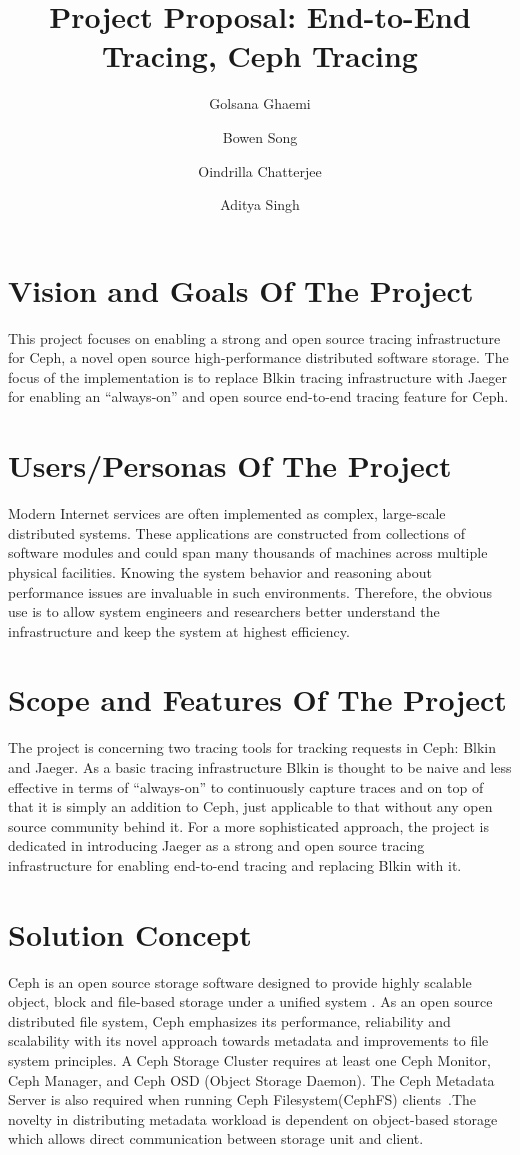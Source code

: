 \documentclass[a4paper, 11pt]{article}
\title{Project Proposal: End-to-End Tracing, Ceph Tracing}
\author[1]{Golsana Ghaemi}
\author[1]{Bowen Song}
\author[1]{Oindrilla Chatterjee}
\author[1]{Aditya Singh}
\affil[1]{Department of Electrical and Computer Engineering}
\affil[1]{Boston University}
\date{}
\begin{document}
\maketitle
\section{Vision and Goals Of The Project}

This project focuses on enabling a strong and open source tracing infrastructure for Ceph, a novel open source high-performance distributed software storage. The focus of the implementation is to replace Blkin tracing infrastructure with Jaeger for enabling an “always-on” and open source end-to-end tracing feature for Ceph.

\section{Users/Personas Of The Project}

Modern Internet services are often implemented as complex, large-scale distributed systems. These applications are constructed from collections of software modules and could span many thousands of machines across multiple physical facilities. Knowing the system behavior and reasoning about performance issues are invaluable in such environments\cite{Dapper}. Therefore, the obvious use is to allow system engineers and researchers better understand the infrastructure and keep the system at highest efficiency.


\section{Scope and Features Of The Project}

The project is concerning two tracing tools for tracking requests in Ceph: Blkin and Jaeger. As a basic tracing infrastructure Blkin is thought to be naive and less effective in terms of “always-on” to continuously capture traces and on top of that it is simply an addition to Ceph, just applicable to that without any open source community behind it. For a more sophisticated approach, the project is dedicated in introducing Jaeger as a strong and open source tracing infrastructure for enabling end-to-end tracing and replacing Blkin with it.


\section{Solution Concept}
Ceph is an open source storage software designed to provide highly scalable object, block and file-based storage under a unified system \cite{ceph_home}. As an open source distributed file system, Ceph emphasizes its performance, reliability and scalability with its novel approach towards metadata and improvements to file system principles. A Ceph Storage Cluster requires at least one Ceph Monitor, Ceph Manager, and Ceph OSD (Object Storage Daemon). The Ceph Metadata Server is also required when running Ceph Filesystem(CephFS) clients~\cite{ceph_intro}.The novelty in distributing metadata workload is dependent on object-based storage which allows direct communication between storage unit and client.\\
\end{document}
